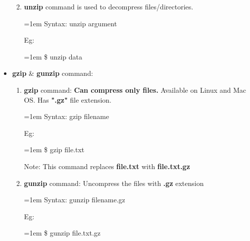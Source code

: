 \begin{flushleft}
\begin{itemize}
\begin{enumerate}
\begin{itemize}
			\end{itemize}
		
		
		\item \textbf{unzip} command is used to decompress files/directories.
		\begin{tcolorbox}[breakable,notitle,boxrule=0pt,colback=pink,colframe=pink]
			\color{black}
			\font=1em
			Syntax: unzip argument
			\font=4pt
		\end{tcolorbox}
		Eg:
		\bigskip
		\begin{tcolorbox}[breakable,notitle,boxrule=-0pt,colback=black,colframe=black]
			\color{green}
			\font=1em
			\$ unzip data
			\font=4pt
		\end{tcolorbox}
		
		\end{enumerate}
	\newpage
	\item \textbf{gzip} \& \textbf{gunzip} command:
	\begin{enumerate}
		\item \textbf{gzip} command: \textbf{Can compress only files.} Available on Linux and Mac OS. Has \textbf{".gz"} file extension.
		\bigskip
		\begin{tcolorbox}[breakable,notitle,boxrule=0pt,colback=pink,colframe=pink]
			\color{black}
			\font=1em
			Syntax: gzip filename
			\font=4pt
		\end{tcolorbox}
		Eg:
		\begin{tcolorbox}[breakable,notitle,boxrule=-0pt,colback=black,colframe=black]
			\color{green}
			\font=1em
			\$ gzip file.txt
			\font=4pt
		\end{tcolorbox}
	
		\bigskip
		\begin{tcolorbox}[breakable,notitle,boxrule=0pt,colback=yellow,colframe=yellow]
			\color{black}
			Note: This command replaces \textbf{file.txt} with \textbf{file.txt.gz}
		\end{tcolorbox}
			
		
		\item \textbf{gunzip} command: Uncompress the files with \textbf{.gz} extension
		\bigskip
		\begin{tcolorbox}[breakable,notitle,boxrule=0pt,colback=pink,colframe=pink]
			\color{black}
			\font=1em
			Syntax: gunzip filename.gz
			\font=4pt
		\end{tcolorbox}
		Eg:
		\begin{tcolorbox}[breakable,notitle,boxrule=-0pt,colback=black,colframe=black]
			\color{green}
			\font=1em
			\$ gunzip file.txt.gz
			\font=4pt
		\end{tcolorbox}		
	\end{enumerate}
		

\end{itemize}
\end{flushleft}
